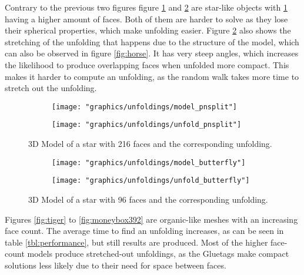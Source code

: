 \documentclass[draft,final]{vutinfth} %
\begin{document}
Contrary to the previous two figures figure \ref{fig:pnsplit} and \ref{fig:butterfly} are star-like objects with \ref{fig:pnsplit} having a higher amount of faces. Both of them are harder to solve as they lose their spherical properties, which make unfolding easier. Figure \ref{fig:butterfly} also shows the stretching of the unfolding that happens due to the structure of the model, which can also be observed in figure \ref{fig:horse}. It has very steep angles, which increases the likelihood to produce overlapping faces when unfolded more compact. This makes it harder to compute an unfolding, as the random walk takes more time to stretch out the unfolding.

\begin{figure}
  \begin{subfigure}[b]{0.475\textwidth}
    \texttt{[image: "graphics/unfoldings/model\_pnsplit"]}
  \end{subfigure}
  \begin{subfigure}[b]{0.475\textwidth}
    \texttt{[image: "graphics/unfoldings/unfold\_pnsplit"]}
  \end{subfigure}
  
  \caption{3D Model of a star with 216 faces and the corresponding unfolding.}
  \label{fig:pnsplit}
\end{figure}

\begin{figure}
  \begin{subfigure}[b]{0.475\textwidth}
    \texttt{[image: "graphics/unfoldings/model\_butterfly"]}
  \end{subfigure}
  \begin{subfigure}[b]{0.475\textwidth}
    \texttt{[image: "graphics/unfoldings/unfold\_butterfly"]}
  \end{subfigure}
  
  \caption{3D Model of a star with 96 faces and the corresponding unfolding.}
  \label{fig:butterfly}
\end{figure}

\newpage

Figures \ref{fig:tiger} to \ref{fig:moneybox392} are organic-like meshes with an increasing face count. The average time to find an unfolding increases, as can be seen in table \ref{tbl:performance}, but still results are produced. Most of the higher face-count models produce stretched-out unfoldings, as the Gluetags make compact solutions less likely due to their need for space between faces.
\end{document}
